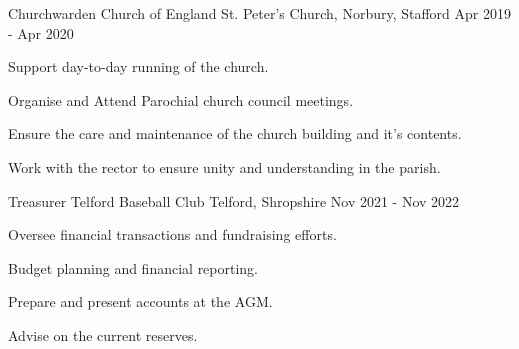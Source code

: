 

\begin{cventries}

	\cventry
	{Churchwarden} %
	{Church of England} %
	{St. Peter's Church, Norbury, Stafford} %
	{Apr 2019 - Apr 2020} %
	{
		\begin{cvitems} %
		\item {Support day-to-day running of the church.}
		\item {Organise and Attend Parochial church council meetings.}
		\item {Ensure the care and maintenance of the church building and it's contents.}
		\item {Work with the rector to ensure unity and understanding in the parish.}
		\end{cvitems}
	}
	\cventry
	{Treasurer} %
	{Telford Baseball Club} %
	{Telford, Shropshire} %
	{Nov 2021 - Nov 2022} %
	{
		\begin{cvitems} %
		\item {Oversee financial transactions and fundraising efforts.}
		\item {Budget planning and financial reporting.}
		\item {Prepare and present accounts at the AGM.}
		\item {Advise on the current reserves.}
		\end{cvitems}
	}
\end{cventries}

